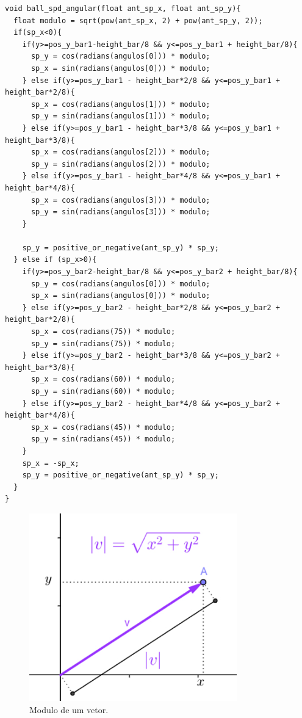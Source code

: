 \documentclass[conference]{IEEEtran}
\newcommand\largurafig{9cm}
\begin{document}
\begin{lstlisting}
void ball_spd_angular(float ant_sp_x, float ant_sp_y){
  float modulo = sqrt(pow(ant_sp_x, 2) + pow(ant_sp_y, 2));   
  if(sp_x<0){            
    if(y>=pos_y_bar1-height_bar/8 && y<=pos_y_bar1 + height_bar/8){
      sp_y = cos(radians(angulos[0])) * modulo;
      sp_x = sin(radians(angulos[0])) * modulo;
    } else if(y>=pos_y_bar1 - height_bar*2/8 && y<=pos_y_bar1 + height_bar*2/8){
      sp_x = cos(radians(angulos[1])) * modulo; 
      sp_y = sin(radians(angulos[1])) * modulo;
    } else if(y>=pos_y_bar1 - height_bar*3/8 && y<=pos_y_bar1 + height_bar*3/8){
      sp_x = cos(radians(angulos[2])) * modulo;
      sp_y = sin(radians(angulos[2])) * modulo;
    } else if(y>=pos_y_bar1 - height_bar*4/8 && y<=pos_y_bar1 + height_bar*4/8){
      sp_x = cos(radians(angulos[3])) * modulo; 
      sp_y = sin(radians(angulos[3])) * modulo;
    }
    
    sp_y = positive_or_negative(ant_sp_y) * sp_y;
  } else if (sp_x>0){   
    if(y>=pos_y_bar2-height_bar/8 && y<=pos_y_bar2 + height_bar/8){
      sp_y = cos(radians(angulos[0])) * modulo;
      sp_x = sin(radians(angulos[0])) * modulo;
    } else if(y>=pos_y_bar2 - height_bar*2/8 && y<=pos_y_bar2 + height_bar*2/8){
      sp_x = cos(radians(75)) * modulo;
      sp_y = sin(radians(75)) * modulo;
    } else if(y>=pos_y_bar2 - height_bar*3/8 && y<=pos_y_bar2 + height_bar*3/8){
      sp_x = cos(radians(60)) * modulo;
      sp_y = sin(radians(60)) * modulo;
    } else if(y>=pos_y_bar2 - height_bar*4/8 && y<=pos_y_bar2 + height_bar*4/8){
      sp_x = cos(radians(45)) * modulo;  
      sp_y = sin(radians(45)) * modulo;
    }
    sp_x = -sp_x;
    sp_y = positive_or_negative(ant_sp_y) * sp_y;
  }
}
\end{lstlisting}

\begin{figure}[htbp]
\centerline{
    \includegraphics[width = \largurafig]{images/modulo_vetor.jpg}
    }
\caption{Modulo de um vetor.}
\label{fig:modulo}
\end{figure}
\end{document}
